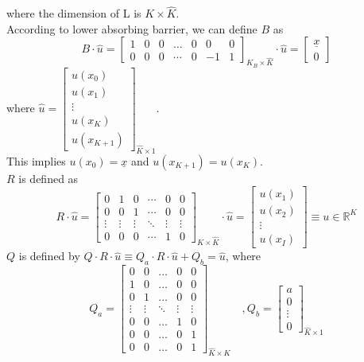 \documentclass[11pt]{article}
\newcommand{\R}{\ensuremath{\mathbb{R}}}
\begin{document}
where the dimension of L is $K\times\hat{K}$.\\
According to lower absorbing barrier, we can define $B$ as
\begin{equation}
B\cdot\hat{u} =\begin{bmatrix}
1&0&0&\dots&0&0&0\\
0&0&0&\cdots&0&-1&1
\end{bmatrix}_{K_B\times \hat{K}}\cdot\hat{u} = \begin{bmatrix}
\underline{\textit{\~{x}}}\\
0
\end{bmatrix}
\end{equation}
where $\hat{u} = \begin{bmatrix}
u(x_0)\\
u(x_1)\\
\vdots\\
u(x_K)\\
u(x_{K+1})
\end{bmatrix}_{\hat{K}\times 1}$.\\
This implies $u(x_0) = \underline{\textit{\~{x}}}$ and $u(x_{K+1}) = u(x_K)$.\\
$R$ is defined as 
\begin{equation}
R\cdot \hat{u} =\begin{bmatrix}
0&1&0&\cdots&0&0\\
0&0&1&\cdots&0&0\\
\vdots&\vdots&\vdots&\ddots&\vdots&\vdots\\
0&0&0&\cdots&1&0
\end{bmatrix}_{K\times\hat{K}}\cdot \hat{u}		 
=\begin{bmatrix}
u(x_1)\\
u(x_2)\\
\vdots\\
u(x_I)
\end{bmatrix} \equiv u\in \R^{K} 
\end{equation}
$Q$ is defined by $Q\cdot R\cdot\hat{u}\equiv Q_a\cdot R\cdot\hat{u}+Q_b = \hat{u}$, where 
\begin{equation}
Q_a = \begin{bmatrix}
0& 0&\dots&0&0\\
1&0&\dots&0&0\\
0&1&\dots&0&0\\
\vdots&\vdots&\ddots&\vdots&\vdots\\
0&0&\dots&1&0\\
0&0&\dots&0&1\\
0&0&\dots&0&1
\end{bmatrix}_{\hat{K}\times K}\quad , Q_b = \begin{bmatrix}
a\\
0\\
\vdots\\
0
\end{bmatrix}_{\hat{K}\times 1}
\end{equation}
\end{document}
